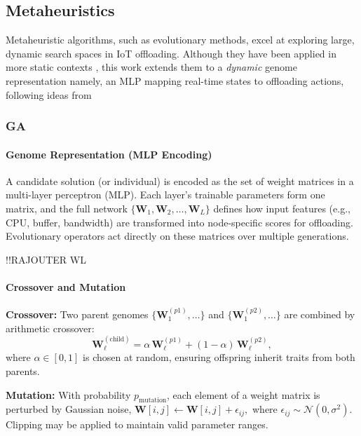 \documentclass[preprint,12pt]{elsarticle}
\begin{document}
\subsection{Metaheuristics}
\label{subsec:metaheuristics}

Metaheuristic algorithms, such as evolutionary methods, excel at exploring large, dynamic search spaces in IoT offloading. Although they have been applied in more static contexts \cite{bernard_d-npga_2024}, this work extends them to a \emph{dynamic} genome representation namely, an MLP mapping real-time states to offloading actions, following ideas from \cite{such2018deepneuroevolutiongeneticalgorithms}




\subsubsection{GA}


\paragraph{Genome Representation (MLP Encoding)}
A candidate solution (or individual) is encoded as the set of weight matrices in a multi-layer perceptron (MLP). Each layer’s trainable parameters form one matrix, and the full network 
\(\{\mathbf{W}_1, \mathbf{W}_2, \dots, \mathbf{W}_L\}\) 
defines how input features (e.g., CPU, buffer, bandwidth) are transformed into node-specific scores for offloading. Evolutionary operators act directly on these matrices over multiple generations.


!!RAJOUTER WL
\paragraph{Crossover and Mutation}
\textbf{Crossover:} Two parent genomes 
\(\{\mathbf{W}_1^{(p1)}, \dots\}\) 
and 
\(\{\mathbf{W}_1^{(p2)}, \dots\}\) 
are combined by arithmetic crossover:
\[
\mathbf{W}_\ell^{(\text{child})} 
= \alpha\,\mathbf{W}_\ell^{(p1)} 
+ (1-\alpha)\,\mathbf{W}_\ell^{(p2)}, 
\]
where \(\alpha\in[0,1]\) is chosen at random, ensuring offspring inherit traits from both parents.

\textbf{Mutation:} With probability \(p_{\text{mutation}}\), each element of a weight matrix is perturbed by Gaussian noise,
\(\mathbf{W}[i,j] \leftarrow \mathbf{W}[i,j] + \epsilon_{ij},\)
where \(\epsilon_{ij} \sim \mathcal{N}(0,\sigma^2)\). Clipping may be applied to maintain valid parameter ranges.
\end{document}
